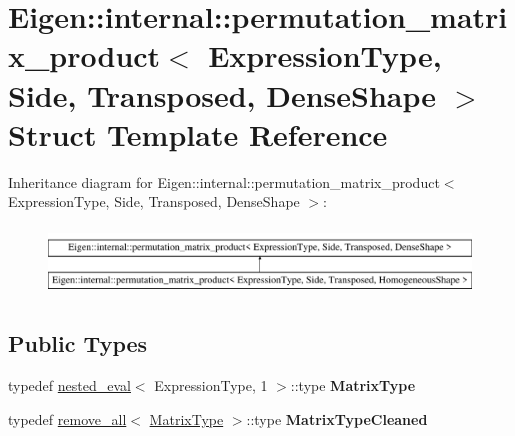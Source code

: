 \hypertarget{struct_eigen_1_1internal_1_1permutation__matrix__product_3_01_expression_type_00_01_side_00_01_t00744509fe9d67128974220180aea840}{}\section{Eigen\+::internal\+::permutation\+\_\+matrix\+\_\+product$<$ Expression\+Type, Side, Transposed, Dense\+Shape $>$ Struct Template Reference}
\label{struct_eigen_1_1internal_1_1permutation__matrix__product_3_01_expression_type_00_01_side_00_01_t00744509fe9d67128974220180aea840}
Inheritance diagram for Eigen\+::internal\+::permutation\+\_\+matrix\+\_\+product$<$ Expression\+Type, Side, Transposed, Dense\+Shape $>$\+:\begin{figure}[H]
\begin{center}
\leavevmode
\includegraphics[height=1.839080cm]{struct_eigen_1_1internal_1_1permutation__matrix__product_3_01_expression_type_00_01_side_00_01_t00744509fe9d67128974220180aea840}
\end{center}
\end{figure}
\subsection*{Public Types}
\begin{DoxyCompactItemize}
\item 
\mbox{\label{struct_eigen_1_1internal_1_1permutation__matrix__product_3_01_expression_type_00_01_side_00_01_t00744509fe9d67128974220180aea840_af969c77893a9291a1b9625c307a5daf6}} 
typedef \mbox{\hyperlink{struct_eigen_1_1internal_1_1nested__eval}{nested\+\_\+eval}}$<$ Expression\+Type, 1 $>$\+::type {\bfseries Matrix\+Type}
\item 
\mbox{\label{struct_eigen_1_1internal_1_1permutation__matrix__product_3_01_expression_type_00_01_side_00_01_t00744509fe9d67128974220180aea840_ab490ca1ee4f78042bf0abb820f155b50}} 
typedef \mbox{\hyperlink{struct_eigen_1_1internal_1_1remove__all}{remove\+\_\+all}}$<$ \mbox{\hyperlink{struct_eigen_1_1internal_1_1true__type}{Matrix\+Type}} $>$\+::type {\bfseries Matrix\+Type\+Cleaned}
\end{DoxyCompactItemize}
